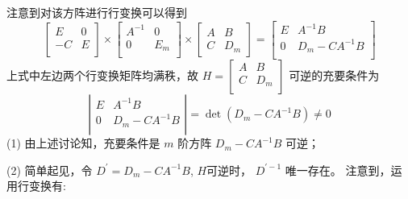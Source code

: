 \documentclass{article}
\begin{document}
\begin{spacing}{1.5}
\begin{enumerate}
    注意到对该方阵进行行变换可以得到 
    \begin{equation*}
        \left[
            \begin{array}{cc}
                E & 0 \\
                -C & E \\
            \end{array}
        \right]
        \times
        \left[
            \begin{array}{cc}
                A^{-1} & 0 \\
                0 & E_m \\
            \end{array}
        \right]
        \times
        \left[
            \begin{array}{cc}
                A & B \\
                C & D_m
            \end{array}
        \right]
        = 
        \left[
            \begin{array}{cc}
                E & A^{-1}B \\
                0 & D_m - CA^{-1}B \\
            \end{array}
        \right]
    \end{equation*}
    上式中左边两个行变换矩阵均满秩，故 $H=\left[\begin{array}{cc}A&B\\C&D_m\\\end{array}\right]$ 可逆的充要条件为
    \begin{equation*}
        \left|
            \begin{array}{cc}
                E & A^{-1}B \\
                0 & D_m - CA^{-1}B \\
            \end{array}
        \right|
        = \det(D_m - CA^{-1}B)\ne 0
    \end{equation*}
    (1) 由上述讨论知，充要条件是 $m$ 阶方阵 $D_m-CA^{-1}B$ 可逆；
    
    (2) 简单起见，令 $D^\prime=D_m-CA^{-1}B$, $H$可逆时， $D^{\prime-1}$ 唯一存在。
    注意到，运用行变换有:


\end{enumerate}
\end{spacing}
\end{document}
